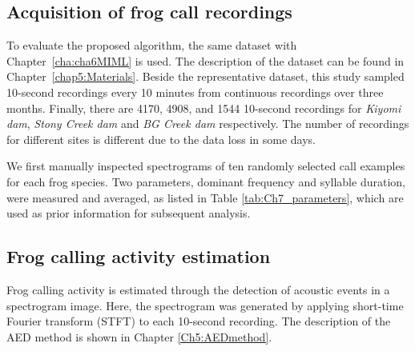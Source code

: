 \subsection{Acquisition of frog call recordings}

To evaluate the proposed algorithm, the same dataset with Chapter~\ref{cha:cha6MIML} is used. The description of the dataset can be found in Chapter~\ref{chap5:Materials}. Beside the representative dataset, this study  sampled 10-second recordings every 10 minutes from continuous recordings over three months. Finally, there are 4170, 4908, and 1544 10-second recordings for \textit{Kiyomi dam}, \textit{Stony Creek dam} and \textit{BG Creek dam} respectively. The number of recordings for different sites is different due to the data loss in some days.



We first manually inspected spectrograms of ten randomly selected call examples for each frog species. Two parameters, dominant frequency and syllable duration, were measured and averaged, as listed in Table \ref{tab:Ch7_parameters}, which are used as prior information for subsequent analysis.




\subsection{Frog calling activity estimation}
Frog calling activity is estimated through the detection of acoustic events in a spectrogram image. Here, the spectrogram was generated by applying short-time Fourier transform (STFT) to each 10-second recording. The description of the AED method is shown in Chapter \ref{Ch5:AEDmethod}.


